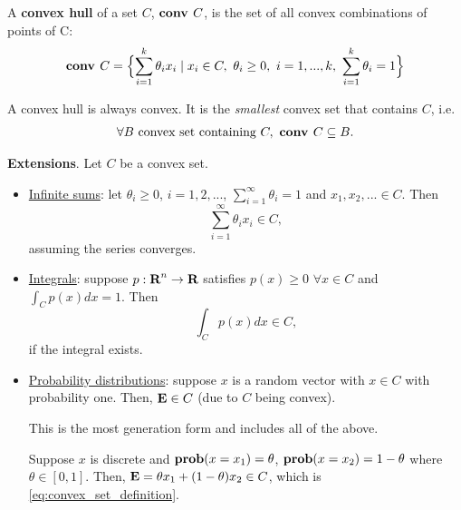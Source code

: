 \begin{Definition}
  A \textbf{convex hull} of a set $C$, $\conv{C}$, is the set of all convex
  combinations of points of C:
  \begin{equation*}
    \conv{C} = \Bigl\{
    \sum_{i=1}^k\theta_ix_i \mid x_i\in C,\,\,\theta_i\ge 0,\,\,
    i=1,...,k,\,\,\sum_{i=1}^k\theta_i = 1
    \Bigr\}
  \end{equation*}
\end{Definition}

\begin{Fact}
  A convex hull is always convex. It is the \textit{smallest} convex set that
  contains $C$, i.e.\
  \begin{eqnarray*}
    \forall B\text{ convex set containing }C,\,\,\conv{C}\subseteq B.
  \end{eqnarray*}
\end{Fact}

\begin{Fact}
  \textbf{Extensions}. Let $C$ be a convex set.
  \begin{itemize}
  \item \underline{Infinite sums}: let $\theta_i\ge 0$, $i=1,2,...$,
    $\sum_{i=1}^\infty \theta_i = 1$ and $x_1,x_2,...\in C$. Then
    \begin{equation*}
      \sum_{i=1}^\infty \theta_ix_i\in C,
    \end{equation*}
    assuming the series converges.
  \item \underline{Integrals}: suppose $p:\Reals^n\to\Reals$ satisfies
    $p(x)\ge 0$ $\forall x\in C$ and $\int_Cp(x)dx=1$. Then
    \begin{equation*}
      \int_C p(x)dx\in C,
    \end{equation*}
    if the integral exists.
  \item \underline{Probability distributions}: suppose $x$ is a random vector
    with $x\in C$ with probability one. Then, $\Expectation x\in C$ (due to $C$
    being convex).

    \begin{Fact}
      {\color{red} This is the most generation form and includes all of the above}.
    \end{Fact}

    \begin{Example}
      Suppose $x$ is discrete and $\Prob(x=x_1)=\theta$, $\Prob(x=x_2)=1-\theta$
      where $\theta\in[0,1]$. Then, $\Expectation x=\theta x_1+(1-\theta)x_2\in
      C$, which is \eqref{eq:convex_set_definition}.
    \end{Example}
  \end{itemize}
\end{Fact}

